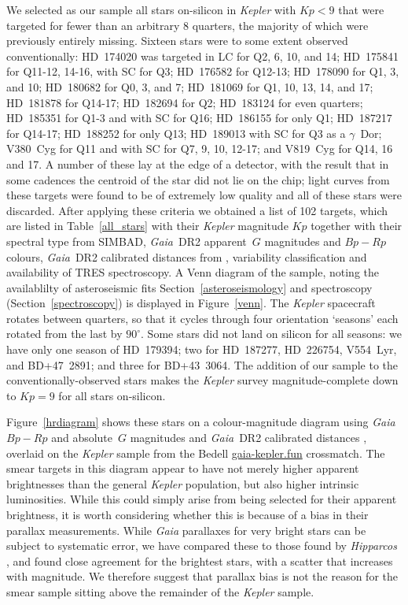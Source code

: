 \documentclass[a4paper,fleqn,usenatbib]{mnras}
\newcommand{\kepler}{\emph{Kepler}\xspace}
\newcommand{\gaia}{\emph{Gaia}\xspace}
\begin{document}
We selected as our sample all stars on-silicon in \kepler with $Kp<9$ that were targeted for fewer than an arbitrary $8$ quarters, the majority of which were previously entirely missing. Sixteen stars were to some extent observed conventionally: HD~174020 was targeted in LC for Q2, 6, 10, and 14; HD~175841 for Q11-12, 14-16, with SC for Q3; HD~176582 for Q12-13; HD~178090 for Q1, 3, and 10; HD~180682 for Q0, 3, and 7; HD~181069 for Q1, 10, 13, 14, and 17; HD~181878 for Q14-17; HD~182694 for Q2; HD~183124 for even quarters; HD~185351 for Q1-3 and with SC for Q16; HD~186155 for only Q1; HD~187217 for Q14-17; HD~188252 for only Q13; HD~189013 with SC for Q3 as a $\gamma$~Dor; V380~Cyg for Q11 and with SC for Q7, 9, 10, 12-17; and V819~Cyg for Q14, 16 and 17. A number of these lay at the edge of a detector, with the result that in some cadences the centroid of the star did not lie on the chip; light curves from these targets were found to be of extremely low quality and all of these stars were discarded. After applying these criteria we obtained a list of 102 targets, which are listed in Table~\ref{all_stars} with their \kepler magnitude $Kp$ together with their spectral type from SIMBAD, \gaia~DR2 apparent~$G$ magnitudes and $Bp-Rp$ colours, \gaia~DR2 calibrated distances from \citet{gaiadists}, variability classification and availability of TRES spectroscopy. A Venn diagram of the sample, noting the availablilty of asteroseismic fits Section~\ref{asteroseismology} and spectroscopy (Section~\ref{spectroscopy}) is displayed in Figure~\ref{venn}. The \kepler spacecraft rotates between quarters, so that it cycles through four orientation `seasons' each rotated from the last by $90^{\circ}$. Some stars did not land on silicon for all seasons: we have only one season of HD~179394; two for HD~187277, HD~226754, V554~Lyr, and BD+47~2891; and three for BD+43~3064. The addition of our sample to the conventionally-observed stars makes the \kepler survey magnitude-complete down to $Kp=9$ for all stars on-silicon.

Figure~\ref{hrdiagram} shows these stars on a colour-magnitude diagram using \gaia $Bp-Rp$ and absolute~$G$ magnitudes and \gaia~DR2 calibrated distances \citep{gaiadists}, overlaid on the \kepler sample from the Bedell \url{gaia-kepler.fun} crossmatch. The smear targets in this diagram appear to have not merely higher apparent brightnesses than the general \kepler population, but also higher intrinsic luminosities. While this could simply arise from being selected for their apparent brightness, it is {}worth considering whether this is because of a bias in their parallax measurements. While \gaia parallaxes for very bright stars can be subject to systematic error, we have compared these to those found by \emph{Hipparcos} \citep{vanleeuwen07b}, and found close agreement for the brightest stars, with a scatter that increases with magnitude. We therefore suggest that parallax bias is not the reason for the smear sample sitting above the remainder of the \kepler sample.
\end{document}
